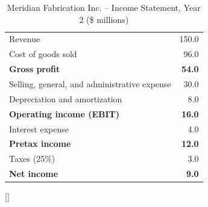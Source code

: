 \documentclass[../ai_in_finance]{subfiles}
\begin{document}
\begin{table}[htbp]
\centering
\begin{lrbox}{\bookmeasuredbox}
\begin{tabular}{lr}
\toprule
Revenue                          & 150.0 \\
Cost of goods sold               & 96.0 \\
\textbf{Gross profit}            & \textbf{54.0} \\
Selling, general, and administrative expense & 30.0 \\
Depreciation and amortization    & 8.0 \\
\textbf{Operating income (EBIT)} & \textbf{16.0} \\
Interest expense                 & 4.0 \\
\textbf{Pretax income}           & \textbf{12.0} \\
Taxes (25\%)                     & 3.0 \\
\textbf{Net income}              & \textbf{9.0} \\
\bottomrule
\end{tabular}
\end{lrbox}
\ifdim\wd\bookmeasuredbox<0.65\linewidth
\setlength{\bookcapwidth}{0.65\linewidth}
\else
\setlength{\bookcapwidth}{\wd\bookmeasuredbox}
\fi
{}[\bookcapwidth]{
\usebox{\bookmeasuredbox}
}{
\caption{Meridian Fabrication Inc. -- Income Statement, Year 2 (\$ millions)}
\label{tab:meridian_is}
}
\end{table}
\end{document}
